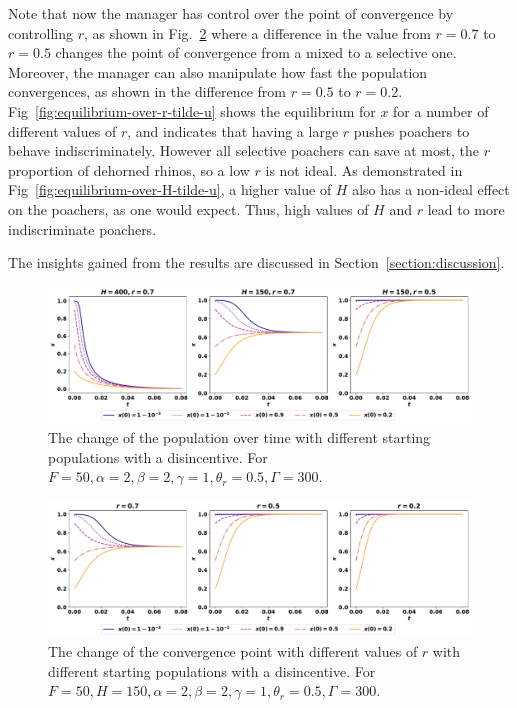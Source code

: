 \documentclass[10pt]{article}
\begin{document}
Note that now the manager has control over the point of convergence by
controlling \(r\), as shown in Fig.~\ref{fig:convergence-over-r}
where
a difference in the value from \(r=0.7\) to \(r=0.5\) changes the point of
convergence from a mixed to a selective one. Moreover, the manager can also
manipulate how fast the population convergences, as shown in the difference from
\(r=0.5\) to \(r=0.2\). Fig~\ref{fig:equilibrium-over-r-tilde-u} shows the
equilibrium for \(x\) for a number of different values of \(r\), and indicates
that having a large \(r\) pushes poachers to behave indiscriminately. However all
selective poachers can save at most, the $r$ proportion of dehorned rhinos, so a
low \(r\) is not ideal. As demonstrated in Fig~\ref{fig:equilibrium-over-H-tilde-u},
a higher value of \(H\) also has a non-ideal effect on the poachers, as one would
expect. Thus, high values of \(H\) and \(r\) lead to more indiscriminate poachers.

\noindent The insights gained from the results are discussed in Section~\ref{section:discussion}.

\begin{figure}[!htbp]
    \includegraphics[width=\textwidth]{images/ESS-new-utility.pdf}
    \caption{The change of the population over 
    time with different starting populations with a disincentive. For \(F=50, \alpha=2,
    \beta=2, \gamma=1, \theta_r=0.5, \Gamma=300\).}
    \label{fig:ess-new-utility}
\end{figure}

\begin{figure}[!htbp]
    \includegraphics[width=\textwidth]{images/ESS-new-utility-based-r.pdf}
    \caption{The change of the convergence point with different values of \(r\)
    with different starting populations with a disincentive. For \(F=50, H=150,
    \alpha=2, \beta=2, \gamma=1, \theta_r=0.5, \Gamma=300\).}
    \label{fig:convergence-over-r}
\end{figure}
\end{document}
